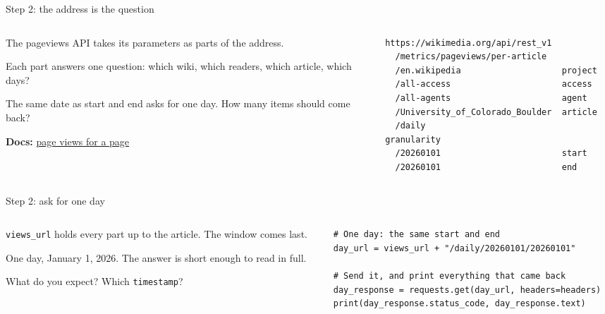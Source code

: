 \documentclass[9pt,aspectratio=169]{beamer}
\begin{document}
\begin{frame}[fragile]{Step 2: the address is the question}
    \begin{columns}[T]
        \begin{column}{0.37\textwidth}
            The pageviews API takes its parameters as parts of the address.

            \medskip
            Each part answers one question: which wiki, which readers, which article, which days?

            \medskip
            The same date as start and end asks for one day. How many items should come back?

            \medskip
            {\scriptsize\textbf{Docs:} \href{https://doc.wikimedia.org/generated-data-platform/aqs/analytics-api/reference/page-views.html\#get-number-of-page-views-for-a-page}{page views for a page}\par}
        \end{column}
        \begin{column}{0.6\textwidth}
\begin{lstlisting}[language={},keepspaces=true]
https://wikimedia.org/api/rest_v1
  /metrics/pageviews/per-article
  /en.wikipedia                    project
  /all-access                      access
  /all-agents                      agent
  /University_of_Colorado_Boulder  article
  /daily                           granularity
  /20260101                        start
  /20260101                        end
\end{lstlisting}
        \end{column}
    \end{columns}
\end{frame}

\begin{frame}[fragile]{Step 2: ask for one day}
    \begin{columns}[T]
        \begin{column}{0.37\textwidth}
            \texttt{views\_url} holds every part up to the article. The window comes last.

            \medskip
            One day, January 1, 2026. The answer is short enough to read in full.

            \medskip
            What do you expect? Which \texttt{timestamp}?
        \end{column}
        \begin{column}{0.6\textwidth}
\begin{lstlisting}
# One day: the same start and end
day_url = views_url + "/daily/20260101/20260101"

# Send it, and print everything that came back
day_response = requests.get(day_url, headers=headers)
print(day_response.status_code, day_response.text)
\end{lstlisting}
        \end{column}
    \end{columns}
\end{frame}
\end{document}
